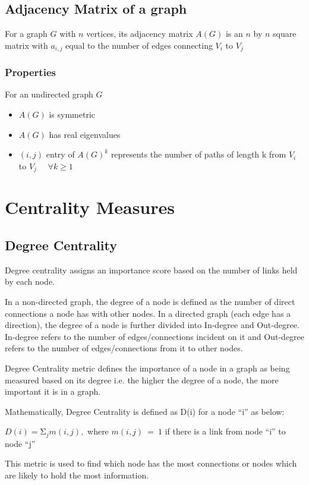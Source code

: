 \documentclass[12pt, a4paper]{article}
\begin{document}
      \subsection{Adjacency Matrix of a graph}
      For a graph $G$ with $n$ vertices, its adjacency matrix $A(G)$ is an $n$ by $n$ square matrix with $a_{i,j}$ equal to the number of edges connecting $V_i$ to $V_j$

        \subsubsection{Properties}
        For an undirected graph $G$
        \begin{itemize}
          \item $A(G)$ is symmetric 
          \item $A(G)$ has real eigenvalues
          \item $(i,j)$ entry of $A(G)^k$ represents the number of paths of length k from $V_i$ to $V_j$ $\quad \forall k \ge 1$
        \end{itemize}

    \section{Centrality Measures}
    \subsection{Degree Centrality}
    \begin{flushleft}
    
    Degree centrality assigns an importance score based on the number of links held by each node.
    
    In a non-directed graph, the degree of a node is defined as the number of direct connections a node has with other nodes. In a directed graph (each edge has a direction), the degree of a node is further divided into In-degree and Out-degree. In-degree refers to the number of edges/connections incident on it and Out-degree refers to the number of edges/connections from it to other nodes.
    
    Degree Centrality metric defines the importance of a node in a graph as being measured based on its degree i.e. the higher the degree of a node, the more important it is in a graph.
    
    Mathematically, Degree Centrality is defined as D(i) for a node “i” as below:

    $D\left(i\right)=\mathrm{\Sigma}_jm\left(i,j\right),$ where $m\left(i,j\right)\ =\ 1 $ if there is a link from node “i” to node “j”

    This metric is used to find which node has the most connections or nodes which are likely to hold the most information.
    \end{flushleft}
\end{document}
